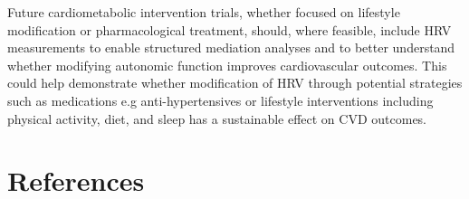 \documentclass[
  a4paper,
  headsepline=true,
  open=any]{scrbook}
\begin{document}
Future cardiometabolic intervention trials, whether focused on lifestyle
modification or pharmacological treatment, should, where feasible,
include HRV measurements to enable structured mediation analyses and to
better understand whether modifying autonomic function improves
cardiovascular outcomes. This could help demonstrate whether
modification of HRV through potential strategies such as medications e.g
anti-hypertensives or lifestyle interventions including physical
activity, diet, and sleep has a sustainable effect on CVD outcomes.


\hypertarget{references}{%
\chapter*{References}\label{references}}

\end{document}
